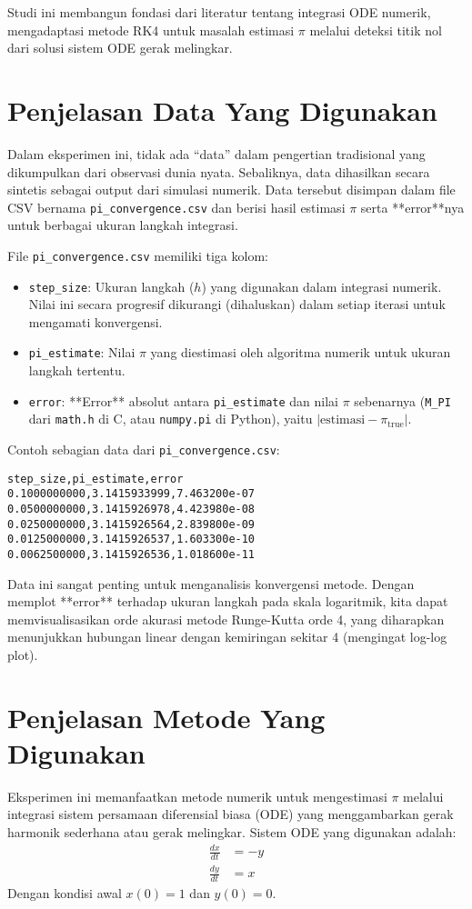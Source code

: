\documentclass[conference]{IEEEtran}
\begin{document}
Studi ini membangun fondasi dari literatur tentang integrasi ODE numerik, mengadaptasi metode RK4 untuk masalah estimasi $\pi$ melalui deteksi titik nol dari solusi sistem ODE gerak melingkar.

\section{Penjelasan Data Yang Digunakan}
Dalam eksperimen ini, tidak ada ``data'' dalam pengertian tradisional yang dikumpulkan dari observasi dunia nyata. Sebaliknya, data dihasilkan secara sintetis sebagai output dari simulasi numerik. Data tersebut disimpan dalam file CSV bernama \texttt{pi\_convergence.csv} dan berisi hasil estimasi $\pi$ serta **error**nya untuk berbagai ukuran langkah integrasi.

File \texttt{pi\_convergence.csv} memiliki tiga kolom:
\begin{itemize}
    \item \texttt{step\_size}: Ukuran langkah ($h$) yang digunakan dalam integrasi numerik. Nilai ini secara progresif dikurangi (dihaluskan) dalam setiap iterasi untuk mengamati konvergensi.
    \item \texttt{pi\_estimate}: Nilai $\pi$ yang diestimasi oleh algoritma numerik untuk ukuran langkah tertentu.
    \item \texttt{error}: **Error** absolut antara \texttt{pi\_estimate} dan nilai $\pi$ sebenarnya (\texttt{M\_PI} dari \texttt{math.h} di C, atau \texttt{numpy.pi} di Python), yaitu $|\text{estimasi} - \pi_{\text{true}}|$.
\end{itemize}

Contoh sebagian data dari \texttt{pi\_convergence.csv}:
\begin{verbatim}
step_size,pi_estimate,error
0.1000000000,3.1415933999,7.463200e-07
0.0500000000,3.1415926978,4.423980e-08
0.0250000000,3.1415926564,2.839800e-09
0.0125000000,3.1415926537,1.603300e-10
0.0062500000,3.1415926536,1.018600e-11
\end{verbatim}

Data ini sangat penting untuk menganalisis konvergensi metode. Dengan memplot **error** terhadap ukuran langkah pada skala logaritmik, kita dapat memvisualisasikan orde akurasi metode Runge-Kutta orde 4, yang diharapkan menunjukkan hubungan linear dengan kemiringan sekitar 4 (mengingat log-log plot).

\section{Penjelasan Metode Yang Digunakan}
Eksperimen ini memanfaatkan metode numerik untuk mengestimasi $\pi$ melalui integrasi sistem persamaan diferensial biasa (ODE) yang menggambarkan gerak harmonik sederhana atau gerak melingkar. Sistem ODE yang digunakan adalah:
\begin{align}
\frac{dx}{dt} &= -y\\
\frac{dy}{dt} &= x
\end{align}
Dengan kondisi awal $x(0) = 1$ dan $y(0) = 0$.
\end{document}
